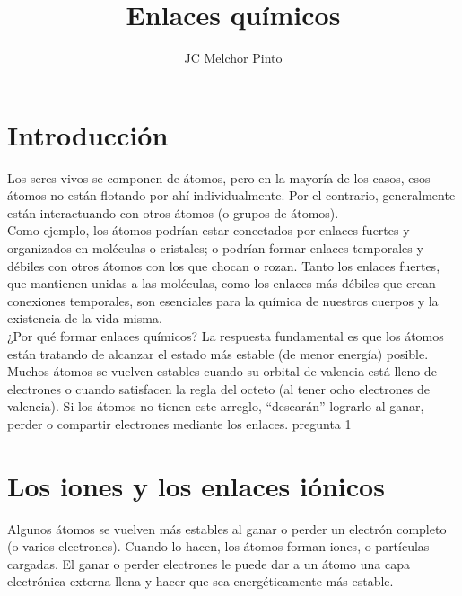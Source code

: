 \documentclass[12pt,addpoints,answers]{guia}
\title{Enlaces químicos}
\author{JC Melchor Pinto}
\begin{document}
\pagestyle{headandfoot}

\INFO
\printanswers
\begin{multicols}{2}
    
    
    
\end{multicols}
\begin{questions}
    \section{Introducción}
    \vbox{\leftskip\leftmargin Los seres vivos se componen de átomos, pero en la mayoría de los casos, esos átomos no están flotando por ahí individualmente. Por el contrario, generalmente están interactuando con otros átomos (o grupos de átomos).\\

        Como ejemplo, los átomos podrían estar conectados por enlaces fuertes y organizados en moléculas o cristales; o podrían formar enlaces temporales y débiles con otros átomos con los que chocan o rozan. Tanto los enlaces fuertes, que mantienen unidas a las moléculas, como los enlaces más débiles que crean conexiones temporales, son esenciales para la química de nuestros cuerpos y la existencia de la vida misma.\\

        ¿Por qué formar enlaces químicos? La respuesta fundamental es que los átomos están tratando de alcanzar el estado más estable (de menor energía) posible. Muchos átomos se vuelven estables cuando su orbital de valencia está lleno de electrones o cuando satisfacen la regla del octeto (al tener ocho electrones de valencia). Si los átomos no tienen este arreglo, ``desearán'' lograrlo al ganar, perder o compartir electrones mediante los enlaces.}
    \question[99] pregunta 1



    \section{Los iones y los enlaces iónicos}

    Algunos átomos se vuelven más estables al ganar o perder un electrón completo (o varios electrones). Cuando lo hacen, los átomos forman iones, o partículas cargadas. El ganar o perder electrones le puede dar a un átomo una capa electrónica externa llena y hacer que sea energéticamente más estable.


\end{questions}
\end{document}
